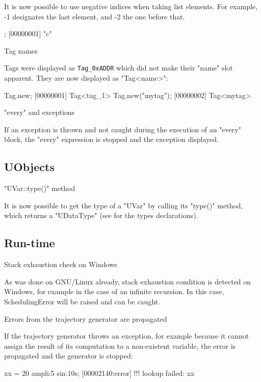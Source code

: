 \begin{description}
It is now possible to use negative indices when taking list elements.
For example, -1 designates the last element, and -2 the one before that.

\begin{urbiscript}
["a", "b", "c"][-1];
[00000001] "c"
\end{urbiscript}

\item Tag names

  Tags were displayed as \lstinline|Tag_0xADDR| which did not make
  their "name" slot apparent. They are now displayed as "Tag<name>":

\begin{urbiscript}
Tag.new;
[00000001] Tag<tag_1>
Tag.new("mytag");
[00000002] Tag<mytag>
\end{urbiscript}

\item "every" and exceptions

If an exception is thrown and not caught during the execution of an "every"
block, the "every" expression is stopped and the exception displayed.
\end{description}

\subsection{UObjects}
\begin{description}
\item "UVar::type()" method

It is now possible to get the type of a "UVar" by calling its "type()"
method, which returns a "UDataType" (see  for the
types declarations).
\end{description}

\subsection{Run-time}
\begin{description}
\item Stack exhaustion check on Windows

  As was done on GNU/Linux already, stack exhaustion condition is detected
  on Windows, for example in the case of an infinite recursion. In this
  case, SchedulingError will be raised and can be caught.

\item Errors from the trajectory generator are propagated

  If the trajectory generator throws an exception, for example because it
  cannot assign the result of its computation to a non-existent variable,
  the error is propagated and the generator is stopped:

\begin{urbiunchecked}
xx = 20 ampli:5 sin:10s;
[00002140:error] !!! lookup failed: xx
\end{urbiunchecked}
\end{description}

